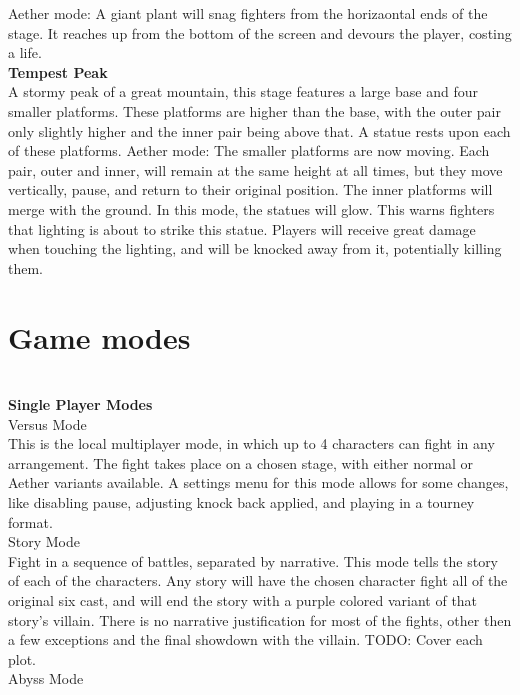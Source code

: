 \documentclass[11pt]{article}
\begin{document}
Aether mode: A giant plant will snag fighters from the horizaontal ends of the stage. It reaches up from the bottom of the screen and devours the player, costing a life.
\\
\textbf{Tempest Peak}\\
A stormy peak of a great mountain, this stage features a large base and four smaller  platforms. These platforms are higher than the base, with the outer pair only slightly higher and the inner pair being above that. A statue rests upon each of these platforms.
Aether mode: The smaller platforms are now moving. Each pair, outer and inner, will remain at the same height at all times, but they move vertically, pause, and return to their original position. The inner platforms will merge with the ground. In this mode, the statues will glow. This warns fighters that lighting is about to strike this statue. Players will receive great damage when touching the lighting, and will be knocked away from it, potentially killing them.
\\

\chapter{Game modes}\\


\textbf{Single Player Modes}\\ %

Versus Mode\\
This is the local multiplayer mode, in which up to 4 characters can fight in any arrangement. The fight takes place on a chosen stage, with either normal or Aether variants available. A settings menu for this mode allows for some changes, like disabling pause, adjusting knock back applied, and playing in a tourney format.
\\

Story Mode\\
Fight in a sequence of battles, separated by narrative. This mode tells the story of each of the characters. Any story will have the chosen character fight all of the original six cast, and will end the story with a purple colored variant of that story's villain. There is no narrative justification for most of the fights, other then a few exceptions and the final showdown with the villain.
TODO: Cover each plot.
\\

Abyss Mode\\
\end{document}
